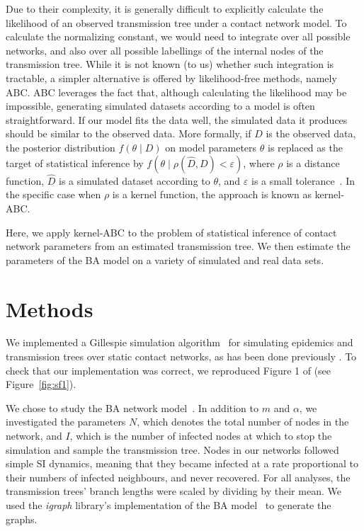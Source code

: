 \documentclass[12pt]{article}\usepackage[]{graphicx}\usepackage[]{color}
\newcommand{\software}[1]{\textit{#1}}
\begin{document}
Due to their complexity, it is generally difficult to explicitly calculate the
likelihood of an observed transmission tree under a contact network model. To
calculate the normalizing constant, we would need to integrate over all
possible networks, and also over all possible labellings of the internal nodes
of the transmission tree. While it is not known (to us) whether such
integration is tractable, a simpler alternative is offered by likelihood-free
methods, namely \gls{ABC}. \gls{ABC} leverages the fact that, although
calculating the likelihood may be impossible, generating simulated datasets
according to a model is often straightforward. If our model fits the data well,
the simulated data it produces should be similar to the observed data. More
formally, if $D$ is the observed data, the posterior distribution $f(\theta
\mid D)$ on model parameters $\theta$ is replaced as the target of statistical
inference by $f(\theta \mid \rho(\hat{D}, D) < \varepsilon)$, where $\rho$ is a
distance function, $\hat{D}$ is a simulated dataset according to $\theta$, and
$\varepsilon$ is a small tolerance~\autocite{sunnaker2013approximate}. In the
specific case when $\rho$ is a kernel function, the approach is known as
kernel-\gls{ABC}.

Here, we apply kernel-\gls{ABC} to the problem of statistical inference of
contact network parameters from an estimated transmission tree. We then
estimate the parameters of the \gls{BA} model on a variety of simulated and
real data sets. 

\section*{Methods}

We implemented a Gillespie simulation algorithm~\autocite{gillespie1976general}
for simulating epidemics and transmission trees over static contact networks,
as has been done previously \autocite[\textit{e.g.}][]{o2010contact,
robinson2013dynamics, leventhal2012inferring, groendyke2011bayesian}. To check
that our implementation was correct, we reproduced Figure 1 of
\textcite{leventhal2012inferring} (see Figure~\ref{fig:sf1}). 

We chose to study the \gls{BA} network model~\autocite{barabasi1999emergence}.
In addition to $m$ and $\alpha$, we investigated the parameters $N$, which
denotes the total number of nodes in the network, and $I$, which is the number
of infected nodes at which to stop the simulation and sample the transmission
tree. Nodes in our networks followed simple \gls{SI} dynamics, meaning that
they became infected at a rate proportional to their numbers of infected
neighbours, and never recovered. For all analyses, the transmission trees'
branch lengths were scaled by dividing by their mean. We used the 
\software{igraph} library's implementation of the \gls{BA}
model~\autocite{csardi2006igraph} to generate the graphs.
\end{document}
